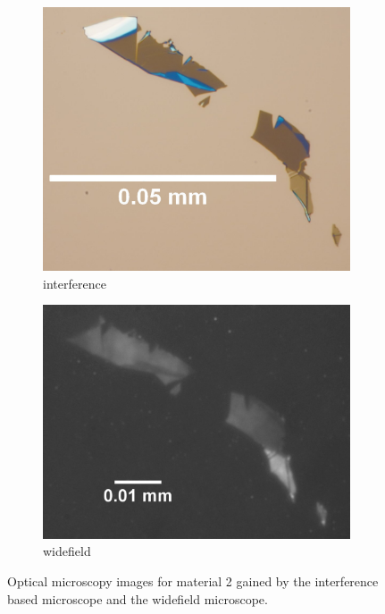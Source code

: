 \begin{figure}[!ht]
    \centering
    \begin{subfigure}{0.47\textwidth}
        \centering
        \includegraphics[width=1.0\textwidth]{img/output_t1/M2_1_100_adj}
        \caption{interference}
	      \label{fig_mono_spec3_int}
    \end{subfigure}
    \hfill
    \begin{subfigure}{0.47\textwidth}
        \centering
        \includegraphics[width=\textwidth]{img/output_t1/M2_1_50_adj_photo4}
        \caption{widefield}
	      \label{fig_mono_spec3_wide}
    \end{subfigure}
    \caption{Optical microscopy images for material 2 gained by the interference based microscope and the widefield microscope.}
	\label{fig_mono_spec3} %
\end{figure}


